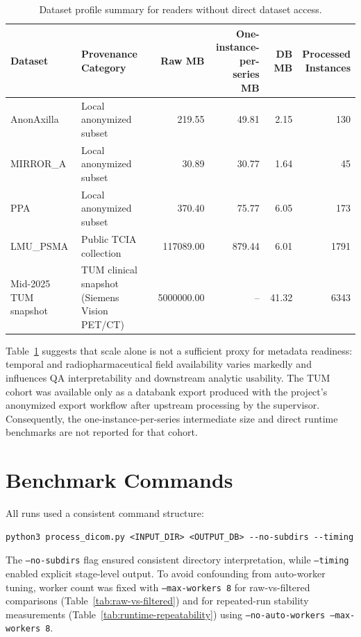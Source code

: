 \begin{table}[htbp]
\centering
\caption{Dataset profile summary for readers without direct dataset access.}
\label{tab:dataset-profile-summary}
\small
\setlength{\tabcolsep}{5pt}
\renewcommand{\arraystretch}{1.12}
\begin{tabularx}{\textwidth}{@{}l >{\raggedright\arraybackslash}X r r r r@{}}
\toprule
Dataset & Provenance Category & Raw MB & \makecell[c]{One-instance-\\per-series MB} & DB MB & \makecell[c]{Processed\\Instances}\\
\midrule
AnonAxilla & Local anonymized subset & 219.55 & 49.81 & 2.15 & 130 \\
MIRROR\_A  & Local anonymized subset & 30.89  & 30.77 & 1.64 & 45 \\
PPA       & Local anonymized subset & 370.40 & 75.77 & 6.05 & 173 \\
LMU\_PSMA & Public TCIA collection  & 117089.00 & 879.44 & 6.01 & 1791 \\
Mid-2025 TUM snapshot  & TUM clinical snapshot (Siemens Vision PET/CT) & 5000000.00 & -- & 41.32 & 6343 \\
\bottomrule
\end{tabularx}
\normalsize
\end{table}

\FloatBarrier
Table~\ref{tab:dataset-profile-summary} suggests that scale alone is not a sufficient proxy for metadata readiness: temporal and radiopharmaceutical field availability varies markedly and influences QA interpretability and downstream analytic usability. The TUM cohort was available only as a databank export produced with the project's anonymized export workflow after upstream processing by the supervisor. Consequently, the one-instance-per-series intermediate size and direct runtime benchmarks are not reported for that cohort.

\section{Benchmark Commands}
All runs used a consistent command structure:
\begin{verbatim}
python3 process_dicom.py <INPUT_DIR> <OUTPUT_DB> --no-subdirs --timing
\end{verbatim}
The \texttt{--no-subdirs} flag ensured consistent directory interpretation, while \texttt{--timing} enabled explicit stage-level output. To avoid confounding from auto-worker tuning, worker count was fixed with \texttt{--max-workers 8} for raw-vs-filtered comparisons (Table~\ref{tab:raw-vs-filtered}) and for repeated-run stability measurements (Table~\ref{tab:runtime-repeatability}) using \texttt{--no-auto-workers --max-workers 8}.

